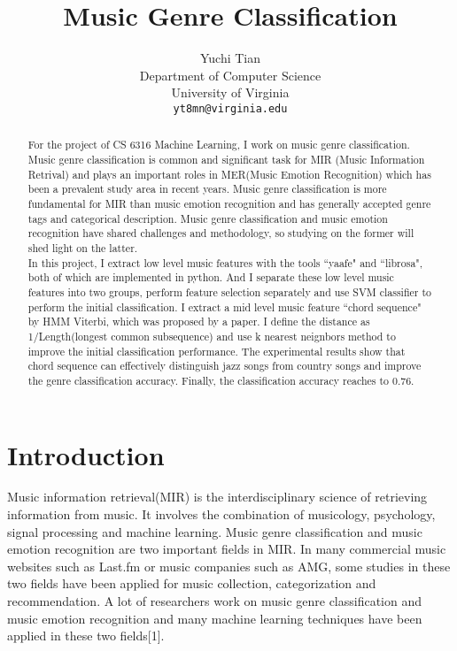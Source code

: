 \documentclass{article} %
\title{Music Genre Classification}
\author{
Yuchi Tian \\
Department of Computer Science\\
University of Virginia\\
\texttt{yt8mn@virginia.edu} \\
}
\begin{document}
\maketitle

\begin{abstract}
For the project of CS 6316 Machine Learning, I work on music genre classification. Music genre classification is common and significant task for MIR (Music Information Retrival) and plays an important roles in MER(Music Emotion Recognition) which has been a prevalent study area in recent years. Music genre classification is more fundamental for MIR than music emotion recognition and has generally accepted genre tags and categorical description. Music genre classification and music emotion recognition have shared challenges and methodology, so studying on the former will shed light on the latter. \\ In this project, I extract low level music features with the tools ``yaafe" and ``librosa", both of which are implemented in python. And I separate these low level music features into two groups, perform feature selection separately and use SVM classifier to perform the initial classification. I extract a mid level music feature ``chord sequence" by HMM Viterbi, which was proposed by a paper. I define the distance as 1/Length(longest common subsequence) and use k nearest neignbors method to improve the initial classification performance. The experimental results show that chord sequence can effectively distinguish jazz songs from country songs and improve the genre classification accuracy. Finally, the classification accuracy reaches to 0.76.
\end{abstract}

\section{Introduction}

Music information retrieval(MIR) is the interdisciplinary science of retrieving information from music. It involves the combination of musicology, psychology, signal processing and machine learning. Music genre classification and music emotion recognition are two important fields in MIR. In many commercial music websites such as Last.fm or music companies such as AMG, some studies in these two fields have been applied for music collection, categorization and recommendation. A lot of researchers work on music genre classification and music emotion recognition and many machine learning techniques have been applied in these two fields[1].
\end{document}
